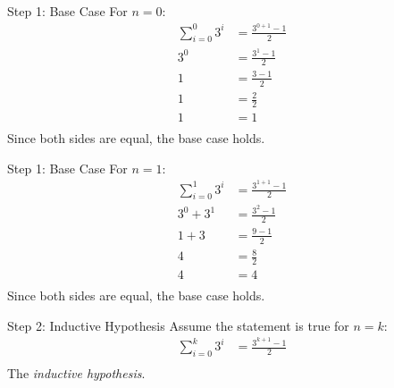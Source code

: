 \documentclass[aspectratio=169]{beamer}
\begin{document}
\begin{frame}{Step 1: Base Case}
    For $n = 0$:
    \begin{align*}
        \sum_{i = 0}^0 3^i &= \frac{3^{0 + 1} - 1}{2} \\
                       3^0 &= \frac{3^1 - 1}{2} \\
                         1 &= \frac{3 - 1}{2} \\
                         1 &= \frac{2}{2} \\
                         1 &= 1 \\
    \end{align*}
    Since both sides are equal, the base case holds. \checkmark
\end{frame}

\begin{frame}{Step 1: Base Case}
    For $n = 1$:
    \begin{align*}
        \sum_{i = 0}^1 3^i &= \frac{3^{1 + 1} - 1}{2} \\
                 3^0 + 3^1 &= \frac{3^2 - 1}{2} \\
                     1 + 3 &= \frac{9 - 1}{2} \\
                         4 &= \frac{8}{2} \\
                         4 &= 4 \\
    \end{align*}
    Since both sides are equal, the base case holds. \checkmark
\end{frame}

\begin{frame}{Step 2: Inductive Hypothesis}
    Assume the statement is true for $n = k$:
    \begin{align*}
        \sum_{i = 0}^k 3^i &= \frac{3^{k + 1} - 1}{2} \\
    \end{align*}
    The \textit{inductive hypothesis}.
\end{frame}
\end{document}

